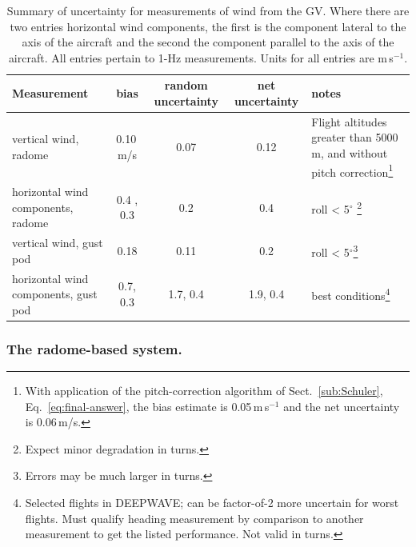 \documentclass[12pt,twoside,english]{article}\usepackage[]{graphicx}\usepackage[]{color}
\providecommand{\tabularnewline}{\\}
\begin{document}
{{\begin{table}
\noindent \centering{}%
\begin{minipage}[t]{1\columnwidth}%
\protect\caption[Summary of uncertainty for measurements of wind from the GV.]{Summary of uncertainty for measurements of wind from the GV. Where there are two
entries horizontal wind components, the first is the component lateral
to the axis of the aircraft and the second the component parallel to the
axis of the aircraft. All entries pertain to 1-Hz measurements. Units for all entries are m\,s$^{-1}$.\label{tab:Summary-of-uncertainty}}


\noindent \begin{center}
\begin{tabular}{>{\centering}p{3cm}ccc>{\centering}p{2.5cm}}
\toprule 
\textbf{Measurement}  &
\textbf{bias}  &
\textbf{random uncertainty}  &
\textbf{net uncertainty}  &
\textbf{notes}\tabularnewline
\midrule
\midrule 
vertical wind, radome  &
0.10\,m/s  &
0.07  &
0.12  &
Flight altitudes greater than 5000 m, and without pitch correction\footnote{With application of the pitch-correction algorithm of Sect.~\ref{sub:Schuler},
Eq.~\ref{eq:final-answer}, the bias estimate is 0.05\,m\,s$^{-1}$
and the net uncertainty is 0.06\,m/s.}\tabularnewline
\midrule 
horizontal wind components, radome  &
0.4 , 0.3  &
0.2  &
0.4  &
roll < 5$^{\circ}$ \footnote{Expect minor degradation in turns.}\tabularnewline
\midrule 
vertical wind, gust pod  &
0.18  &
0.11  &
0.2  &
roll < 5$^{\circ}$\footnote{Errors may be much larger in turns.}\tabularnewline
\midrule 
horizontal wind components, gust pod  &
0.7, 0.3  &
1.7, 0.4  &
1.9, 0.4  &
best conditions\footnote{Selected flights in DEEPWAVE; can be factor-of-2 more uncertain for
worst flights. Must qualify heading measurement by comparison to another
measurement to get the listed performance. Not valid in turns.}\tabularnewline
\bottomrule
\end{tabular}
\par\end{center}%
\end{minipage}
\end{table}



\subsubsection{The radome-based system.\label{sub:conclusions-radome}}

}}
\end{document}
